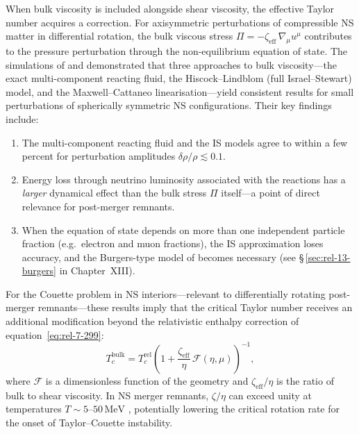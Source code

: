 When bulk viscosity is included alongside shear viscosity, the
effective Taylor number acquires a correction.  For axisymmetric
perturbations of compressible NS matter in differential rotation, the
bulk viscous stress $\Pi = -\zeta_{\mathrm{eff}}\,\nabla_{\mu}u^{\mu}$
contributes to the pressure perturbation through the non-equilibrium
equation of state.  The simulations of \citet{CamelioGavassinoBulkI2022}
and \citet{CamelioGavassinoBulkII2022} demonstrated that three
approaches to bulk viscosity---the exact multi-component reacting fluid,
the Hiscock--Lindblom (full Israel--Stewart) model, and the
Maxwell--Cattaneo linearisation---yield consistent results for small
perturbations of spherically symmetric NS configurations.  Their key
findings include:
\begin{enumerate}
\item The multi-component reacting fluid and the IS models agree to
  within a few percent for perturbation amplitudes
  $\delta\rho/\rho \lesssim 0.1$.
\item Energy loss through neutrino luminosity associated with the
  reactions has a \emph{larger} dynamical effect than the bulk stress
  $\Pi$ itself---a point of direct relevance for post-merger remnants.
\item When the equation of state depends on more than one independent
  particle fraction (e.g.\ electron and muon fractions), the IS
  approximation loses accuracy, and the Burgers-type model of
  \citet{GavassinoBurgers2023} becomes necessary (see
  \S\,\ref{sec:rel-13-burgers} in Chapter~XIII).
\end{enumerate}

For the Couette problem in NS interiors---relevant to differentially
rotating post-merger remnants---these results imply that the critical
Taylor number receives an additional modification beyond the
relativistic enthalpy correction of equation~\eqref{eq:rel-7-299}:
\begin{equation}
\label{eq:rel-7-Tc-bulk}
T_{c}^{\mathrm{bulk}} = T_{c}^{\mathrm{rel}}
  \left(1 + \frac{\zeta_{\mathrm{eff}}}{\eta}\,\mathcal{F}(\eta,\mu)
  \right)^{-1},
\end{equation}
where $\mathcal{F}$ is a dimensionless function of the geometry and
$\zeta_{\mathrm{eff}}/\eta$ is the ratio of bulk to shear viscosity.
In NS merger remnants, $\zeta/\eta$ can exceed unity at temperatures
$T\sim 5$--$50\,\mathrm{MeV}$
\citep{GavassinoBulkViscosity2020,CamelioGavassinoBulkII2022},
potentially lowering the critical rotation rate for the onset of
Taylor--Couette instability.
